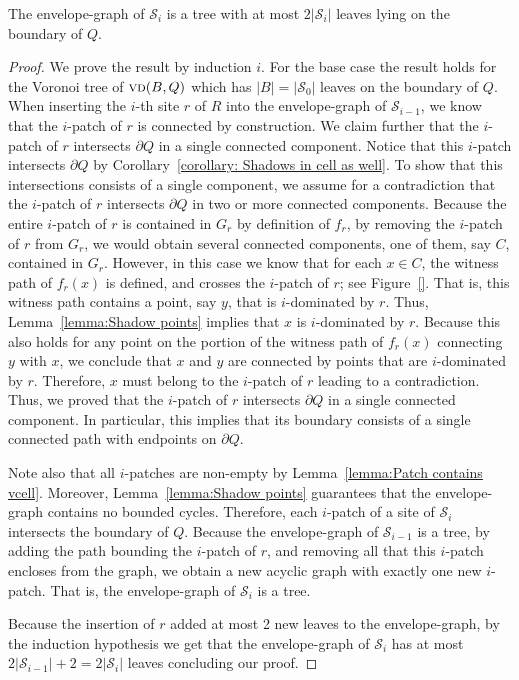 \documentclass[a4paper,UKenglish]{socg-lipics-v2018}
\newcommand{\icell}[1][i]{${#1}$-patch\xspace}
\newcommand{\icells}[1][i]{${#1}$-patches\xspace}
\newcommand{\idom}[1][i]{${#1}$-dominated\xspace}
\newcommand{\s}{\mathcal S}
\newcommand{\vd}[2][P]{\textsc{vd}(#2, #1)}
\begin{document}
\begin{lemma}\label{lemma:Structure of the envelope}
The envelope-graph of $\s_i$ is a tree with at most $2|\s_i|$ leaves lying on the boundary of $Q$.
\end{lemma}
\begin{proof}
We prove the result by induction $i$. For the base case the result holds for the Voronoi tree of $\vd[Q]{B}$ which has $|B| = |\s_0|$ leaves on the boundary of $Q$.
When inserting the $i$-th site $r$ of $R$ into the envelope-graph of $\s_{i-1}$, we know that the \icell of $r$ is connected by construction.
We claim further that the \icell of $r$ intersects $\partial Q$ in a single connected component.
Notice that this \icell intersects $\partial Q$ by Corollary~\ref{corollary: Shadows in cell as well}.
To show that this intersections consists of a single component, we assume for a contradiction that the \icell of $r$ intersects $\partial Q$ in two or more connected components. 
Because the entire \icell of $r$ is contained in $G_r$ by definition of $f_r$,  by removing the \icell of $r$ from $G_r$, we would obtain several connected components, one of them, say $C$, contained in $G_r$. However, in this case we know that for each $x\in C$, the witness path of $f_r(x)$ is defined, and crosses the \icell of $r$; see Figure~\ref{}. 
That is, this witness path contains a point, say $y$, that is \idom by $r$. 
Thus, Lemma~\ref{lemma:Shadow points} implies that $x$ is \idom by $r$. 
Because this also holds for any point on the portion of the witness path of $f_r(x)$ connecting $y$ with $x$, 
we conclude that $x$ and $y$ are connected by points that are \idom by $r$. 
Therefore, $x$ must belong to the \icell of $r$ leading to a contradiction. 
Thus, we proved that the \icell of $r$ intersects $\partial Q$ in a single connected component. 
In particular, this implies that its boundary consists of a single connected path with endpoints on $\partial Q$.

Note also that all \icells are non-empty by Lemma~\ref{lemma:Patch contains vcell}.
Moreover, Lemma~\ref{lemma:Shadow points} guarantees that the envelope-graph contains no bounded cycles. 
Therefore, each \icell of a site of $\s_i$ intersects the boundary of $Q$. 
Because the envelope-graph of $\s_{i-1}$ is a tree, by adding the path bounding the \icell of $r$, and removing all that this \icell encloses from the graph,
we obtain a new acyclic graph with exactly one new \icell. That is, the envelope-graph of $\s_i$ is a tree.

Because the insertion of $r$ added at most 2 new leaves to the envelope-graph, by the induction hypothesis we get that the envelope-graph of $\s_i$ has at most $2|\s_{i-1}| + 2 = 2|\s_i|$ leaves concluding our proof.
\end{proof}
\end{document}

